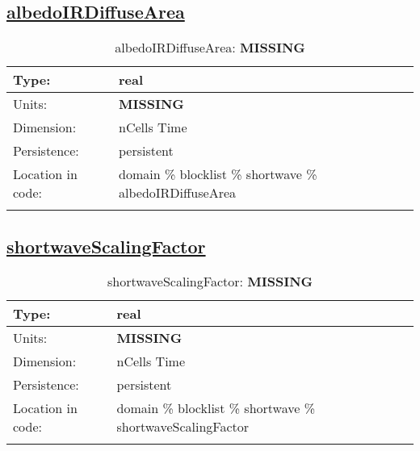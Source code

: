 \subsection[albedoIRDiffuseArea]{\hyperref[sec:var_tab_shortwave]{albedoIRDiffuseArea}}
\label{subsec:var_sec_shortwave_albedoIRDiffuseArea}
\begin{center}
\begin{longtable}{| p{2.0in} | p{4.0in} |}
        \hline 
        Type: & real \\
        \hline 
        Units: & {\bf \color{red} MISSING} \\
        \hline 
        Dimension: & nCells Time \\
        \hline 
        Persistence: & persistent \\
        \hline 
         Location in code: & domain \% blocklist \% shortwave \% albedoIRDiffuseArea \\
         \hline 
    \caption{albedoIRDiffuseArea: {\bf \color{red} MISSING}}
\end{longtable}
\end{center}
\subsection[shortwaveScalingFactor]{\hyperref[sec:var_tab_shortwave]{shortwaveScalingFactor}}
\label{subsec:var_sec_shortwave_shortwaveScalingFactor}
\begin{center}
\begin{longtable}{| p{2.0in} | p{4.0in} |}
        \hline 
        Type: & real \\
        \hline 
        Units: & {\bf \color{red} MISSING} \\
        \hline 
        Dimension: & nCells Time \\
        \hline 
        Persistence: & persistent \\
        \hline 
         Location in code: & domain \% blocklist \% shortwave \% shortwaveScalingFactor \\
         \hline 
    \caption{shortwaveScalingFactor: {\bf \color{red} MISSING}}
\end{longtable}
\end{center}
